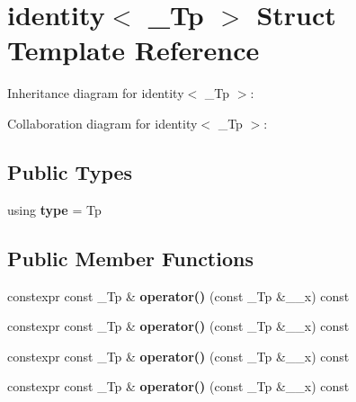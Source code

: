 \hypertarget{structidentity}{}\section{identity$<$ \+\_\+\+Tp $>$ Struct Template Reference}
\label{structidentity}


Inheritance diagram for identity$<$ \+\_\+\+Tp $>$\+:


Collaboration diagram for identity$<$ \+\_\+\+Tp $>$\+:
\subsection*{Public Types}
\begin{DoxyCompactItemize}
\item 
\mbox{\label{structidentity_a06b383af32ced86240bcd5d80dc902f6}} 
using {\bfseries type} = Tp
\end{DoxyCompactItemize}
\subsection*{Public Member Functions}
\begin{DoxyCompactItemize}
\item 
\mbox{\label{structidentity_a259ff3f8f31bc510cfaf13a3f06243f5}} 
constexpr const \+\_\+\+Tp \& {\bfseries operator()} (const \+\_\+\+Tp \&\+\_\+\+\_\+x) const
\item 
\mbox{\label{structidentity_a259ff3f8f31bc510cfaf13a3f06243f5}} 
constexpr const \+\_\+\+Tp \& {\bfseries operator()} (const \+\_\+\+Tp \&\+\_\+\+\_\+x) const
\item 
\mbox{\label{structidentity_a259ff3f8f31bc510cfaf13a3f06243f5}} 
constexpr const \+\_\+\+Tp \& {\bfseries operator()} (const \+\_\+\+Tp \&\+\_\+\+\_\+x) const
\item 
\mbox{\label{structidentity_a259ff3f8f31bc510cfaf13a3f06243f5}} 
constexpr const \+\_\+\+Tp \& {\bfseries operator()} (const \+\_\+\+Tp \&\+\_\+\+\_\+x) const
\end{DoxyCompactItemize}


